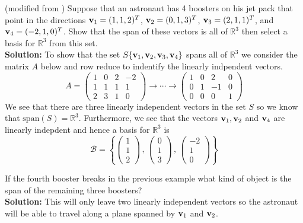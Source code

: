 \begin{example}
    (modified from \cite{Woodruff})  
    Suppose that an astronaut has 4 boosters on his jet pack that
    point in the directions ${\bf v}_1 = (1,1,2)^T$, ${\bf v}_2 = (0,1,3)^T$, ${\bf v}_3 = (2,1,1)^T$,
    and ${\bf v}_4 = (-2,1,0)^T$.  Show that the span of these vectors is all of $\mathbb{R}^3$
    then select a basis for $\mathbb{R}^3$ from this set.\\
    {\bf Solution: } To show that the set $S \{{\bf v}_1,{\bf v}_2,{\bf v}_3, {\bf v}_4\}$ spans all of
    $\mathbb{R}^3$ we consider the matrix $A$ below and row reduce to indentify the
    linearly indpendent vectors.
    \[ A = \begin{pmatrix} 1 & 0 & 2 & -2 \\ 1 & 1 & 1 & 1 \\ 2 & 3 & 1 & 0 \end{pmatrix}
        \to \cdots \to \begin{pmatrix} 1 & 0 & 2 & 0 \\ 0 & 1 & -1 & 0 \\ 0 & 0 & 0 & 1 \end{pmatrix} 
    \]
    We see that there are three linearly independent vectors in the set $S$ so we know
    that $\text{span}(S) = \mathbb{R}^3$.  Furthermore, we see that the vectors ${\bf v}_1,
    {\bf v}_2$ and ${\bf v}_4$ are linearly indepdent and hence a basis for $\mathbb{R}^3$ is 
    \[ \mathcal{B} = \left\{ \begin{pmatrix} 1 \\ 1 \\ 2 \end{pmatrix} \, , \,
        \begin{pmatrix} 0 \\ 1 \\ 3 \end{pmatrix} \, , \, \begin{pmatrix} -2 \\ 1 \\ 0
    \end{pmatrix} \right\} \]
\end{example}

\begin{example}
    If the fourth booster breaks in the previous example what kind of object is the span
    of the remaining three boosters? \\
    {\bf Solution: } This will only leave two linearly independent vectors so the
    astronaut will be able to travel along a plane spanned by ${\bf v}_1$ and ${\bf v}_2$. 
\end{example}



